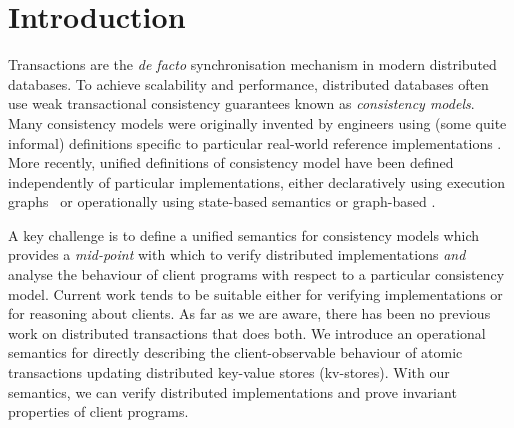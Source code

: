 \section{Introduction}
\label{sec:intro}

Transactions are the \emph{de facto} synchronisation mechanism in
modern distributed databases.  To achieve scalability and performance,
distributed databases often use {weak}  transactional consistency
guarantees known as \emph{consistency models}.  Many consistency
models were originally invented by engineers using (some quite
informal) definitions specific to particular real-world reference
implementations
\cite{gdur,ramp,CORFU,tango,si,distrsi,clocksi,redblue,rola,cops,PSI-RA,NMSI,PSI,wren}.
More recently, unified definitions of consistency model have been
defined independently of particular implementations, either
declaratively using execution graphs~\cite{adya,ev_transactions} or
operationally using state-based semantics or graph-based \cite{seebelieve,alonetogether,sureshConcur}.


A key challenge is to define a unified semantics for consistency
models which provides  a {\em mid-point}  with which to 
verify distributed implementations {\em and} analyse the
behaviour of client programs with respect to a particular consistency model. Current
work tends to be suitable  either for verifying implementations or for reasoning
about
clients. As far as we are aware, there has been no
previous work on distributed transactions that does both. 
We introduce an operational semantics for directly describing the
client-observable behaviour of atomic transactions 
updating distributed key-value stores (kv-stores). With our semantics, we can verify distributed implementations and prove
invariant properties of client programs.  




